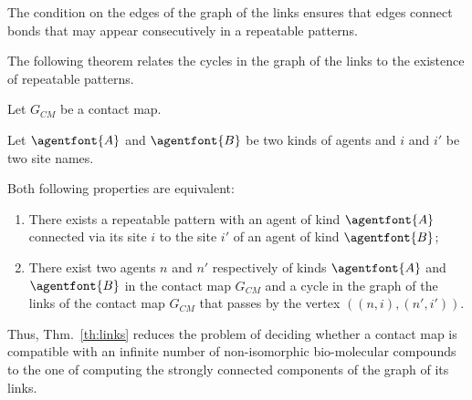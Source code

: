 \documentclass{entcs}
\newcommand{\graphsymb}{G}
\begin{document}
The condition on the edges of the graph of the links  ensures that
edges connect bonds that may appear consecutively in a repeatable patterns.

The following theorem relates the cycles in the graph of the links  to the existence of repeatable patterns.

\begin{theorem}
  \label{th:links}
  Let $\graphsymb_{\textit{CM}}$ be a contact map.

Let $\agentfont{A}$ and $\agentfont{B}$ be two kinds of agents and
$i$ and $i'$ be two site names.

  Both following properties are equivalent:
  \begin{enumerate}
    \item There exists a repeatable pattern
    with an agent of kind $\agentfont{A}$ connected via its site $i$
    to the site $i'$ of an agent of kind $\agentfont{B}$;
\item There exist two agents $n$ and $n'$ respectively of kinds $\agentfont{A}$
and  $\agentfont{B}$ in the contact map $\graphsymb_{\textit{CM}}$ and a  cycle in the graph of the links  of the contact map    $\graphsymb_{\textit{CM}}$  that passes by the vertex $((n,i),(n',i'))$.
  \end{enumerate}
\end{theorem}

Thus, Thm.~\ref{th:links} reduces the problem of deciding whether
a contact map is compatible with an infinite number of non-isomorphic bio-molecular compounds to the one of computing the strongly connected components of the graph of its links.
\end{document}
